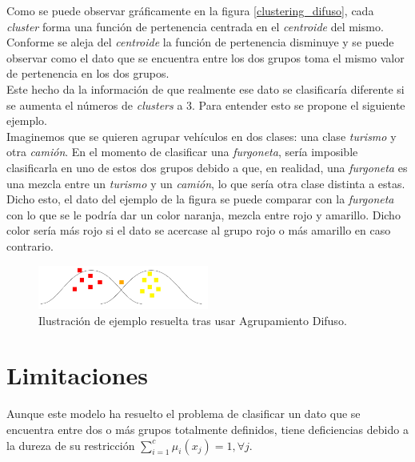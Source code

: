 \documentclass[]{report}
\begin{document}
				Como se puede observar gráficamente en la figura \ref{clustering_difuso}, cada \textit{cluster} forma una función de pertenencia centrada en el \textit{centroide} del mismo. Conforme se aleja del \textit{centroide} la función de pertenencia disminuye y se puede observar como el dato que se encuentra entre los dos grupos toma el mismo valor de pertenencia en los dos grupos.\\
				
				Este hecho da la información de que realmente ese dato se clasificaría diferente si se aumenta el números de \textit{clusters} a 3. Para entender esto se propone el siguiente ejemplo.\\
				
				Imaginemos que se quieren agrupar vehículos en dos clases: una clase \textit{turismo} y otra \textit{camión}. En el momento de clasificar una \textit{furgoneta}, sería imposible clasificarla en uno de estos dos grupos debido a que, en realidad, una \textit{furgoneta} es una mezcla entre un \textit{turismo} y un \textit{camión}, lo que sería otra clase distinta a estas.\\
				
				Dicho esto, el dato del ejemplo de la figura se puede comparar con la \textit{furgoneta} con lo que se le podría dar un color naranja, mezcla entre rojo y amarillo. Dicho color sería más rojo si el dato se acercase al grupo rojo o más amarillo en caso contrario.
				
				\begin{figure}[h!]
					\centering
					\includegraphics[width=0.5\textwidth]{clustering_difuso_solucion.jpg}
					\caption{Ilustración de ejemplo resuelta tras usar Agrupamiento Difuso.}
					\label{clustering_difuso_solucion}
				\end{figure}
		
		\section{Limitaciones}
		
			Aunque este modelo ha resuelto el problema de clasificar un dato que se encuentra entre dos o más grupos totalmente definidos, tiene deficiencias debido a la dureza de su restricción $\sum_{i=1}^c\mu_i(x_j) = 1, \forall j$.\\
			
\end{document}
